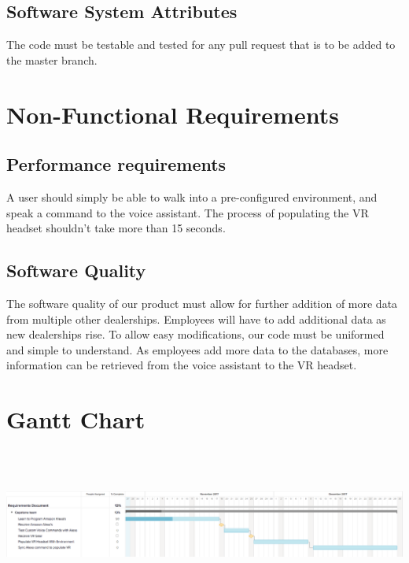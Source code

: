 \documentclass[onecolumn, draftclsnofoot,10pt, compsoc]{IEEEtran}
\begin{document}
    \subsection{Software System Attributes}
        The code must be testable and tested for any pull request that is to be added to the master branch.


\section{Non-Functional Requirements}

\subsection{Performance requirements}
    A user should simply be able to walk into a pre-configured environment, and speak a command to the voice assistant. The process of populating the VR headset shouldn't take more than 15 seconds.
\subsection{Software Quality}
   The software quality of our product must allow for further addition of more data from multiple other dealerships. Employees will have to add additional data as new dealerships rise. To allow easy modifications, our code must be uniformed and simple to understand. As employees add more data to the databases, more information can be retrieved from the voice assistant to the VR headset.

\section{Gantt Chart}
\includegraphics[width=\textwidth,height=5cm]{Gantt}
\end{document}
